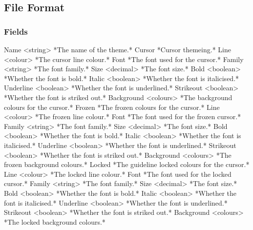 \documentclass[
]{book}
\newenvironment{Shaded}{\begin{snugshade}}{\end{snugshade}}
\newcommand{\AttributeTok}[1]{\textcolor[rgb]{0.77,0.63,0.00}{#1}}
\begin{document}
\hypertarget{file-format}{%
\subsection{File Format}\label{file-format}}

\hypertarget{fields}{%
\subsubsection{Fields}\label{fields}}

\begin{Shaded}
\begin{Highlighting}[]
\AttributeTok{Name <string> *The name of the theme.*}
\AttributeTok{Cursor *Cursor themeing.*}
\AttributeTok{  Line <colour> *The cursor line colour.*}
\AttributeTok{  Font *The font used for the cursor.*}
\AttributeTok{    Family <string> *The font family.*}
\AttributeTok{    Size <decimal> *The font size.*}
\AttributeTok{    Bold <boolean> *Whether the font is bold.*}
\AttributeTok{    Italic <boolean> *Whether the font is italicised.*}
\AttributeTok{    Underline <boolean> *Whether the font is underlined.*}
\AttributeTok{    Strikeout <boolean> *Whether the font is striked out.*}
\AttributeTok{  Background <colours> *The background colours for the cursor.*}
\AttributeTok{  Frozen *The frozen colours for the cursor.*}
\AttributeTok{    Line <colour> *The frozen line colour.*}
\AttributeTok{    Font *The font used for the frozen cursor.*}
\AttributeTok{      Family <string> *The font family.*}
\AttributeTok{      Size <decimal> *The font size.*}
\AttributeTok{      Bold <boolean> *Whether the font is bold.*}
\AttributeTok{      Italic <boolean> *Whether the font is italicised.*}
\AttributeTok{      Underline <boolean> *Whether the font is underlined.*}
\AttributeTok{      Strikeout <boolean> *Whether the font is striked out.*}
\AttributeTok{    Background <colours> *The frozen background colours.*}
\AttributeTok{  Locked *The guideline locked colours for the cursor.*}
\AttributeTok{    Line <colour> *The locked line colour.*}
\AttributeTok{    Font *The font used for the locked cursor.*}
\AttributeTok{      Family <string> *The font family.*}
\AttributeTok{      Size <decimal> *The font size.*}
\AttributeTok{      Bold <boolean> *Whether the font is bold.*}
\AttributeTok{      Italic <boolean> *Whether the font is italicised.*}
\AttributeTok{      Underline <boolean> *Whether the font is underlined.*}
\AttributeTok{      Strikeout <boolean> *Whether the font is striked out.*}
\AttributeTok{    Background <colours> *The locked background colours.*}

\end{Highlighting}
\end{Shaded}
\end{document}

